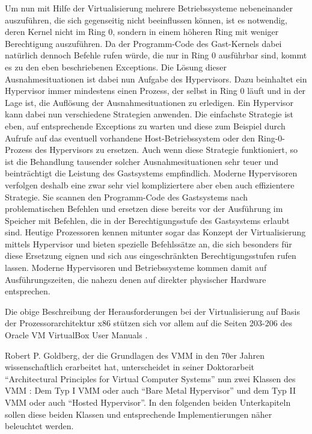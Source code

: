 Um nun mit Hilfe der Virtualisierung mehrere Betriebssysteme nebeneinander auszuführen, die sich gegenseitig nicht beeinflussen können, ist es notwendig, deren Kernel nicht im Ring 0, sondern in einem höheren Ring mit weniger Berechtigung auszuführen. Da der Programm-Code des Gast-Kernels dabei natürlich dennoch Befehle rufen würde, die nur in Ring 0 ausführbar sind, kommt es zu den eben beschriebenen Exceptions. Die Lösung dieser Ausnahmesituationen ist dabei nun Aufgabe des Hypervisors. Dazu beinhaltet ein Hypervisor immer mindestens einen Prozess, der selbst in Ring 0 läuft und in der Lage ist, die Auflösung der Ausnahmesituationen zu erledigen. Ein Hypervisor kann dabei nun verschiedene Strategien anwenden. Die einfachste Strategie ist eben, auf entsprechende Exceptions zu warten und diese zum Beispiel durch Aufrufe auf das eventuell vorhandene Host-Betriebssystem oder den Ring-0-Prozess des Hypervisors zu ersetzen. Auch wenn diese Strategie funktioniert, so ist die Behandlung tausender solcher Ausnahmesituationen sehr teuer und beinträchtigt die Leistung des Gastsystems empfindlich. Moderne Hypervisoren verfolgen deshalb eine zwar sehr viel kompliziertere aber eben auch effizientere Strategie. Sie scannen den Programm-Code des Gastsystems nach problematischen Befehlen und ersetzen diese bereits vor der Ausführung im Speicher mit Befehlen, die in der Berechtigungsstufe des Gastsystems erlaubt sind. Heutige Prozessoren kennen mitunter sogar das Konzept der Virtualisierung mittels Hypervisor und bieten spezielle Befehlssätze an, die sich besonders für diese Ersetzung eignen und sich aus eingeschränkten Berechtigungsstufen rufen lassen. Moderne Hypervisoren und Betriebssysteme kommen damit auf Ausführungszeiten, die nahezu denen auf direkter physischer Hardware entsprechen.

Die obige Beschreibung der Herausforderungen bei der Virtualisierung auf Basis der Prozessorarchitektur x86 stützen sich vor allem auf die Seiten 203-206 des Oracle VM VirtualBox User Manuals \citep{Oracle14}.

Robert P. Goldberg, der die Grundlagen des \ac{VMM} in den 70er Jahren wissenschaftlich erarbeitet hat, unterscheidet in seiner Doktorarbeit "`Architectural Principles for Virtual Computer Systems"' nun zwei Klassen des \ac{VMM} \citep[Vgl.][S. 22 ff.]{Goldberg73}: Dem Typ I \ac{VMM} oder auch "`Bare Metal Hypervisor"' und dem Typ II \ac{VMM} oder auch "`Hosted Hypervisor"'. In den folgenden beiden Unterkapiteln sollen diese beiden Klassen und entsprechende Implementierungen näher beleuchtet werden.

